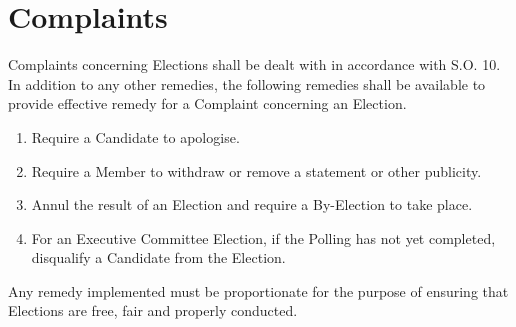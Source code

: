 \section{Complaints}
\npara Complaints concerning Elections shall be dealt with in accordance with S.O. 10.
\npara In addition to any other remedies, the following remedies shall be available to provide effective remedy for a Complaint concerning an Election.
\begin{enumerate}
\item Require a Candidate to apologise.
\item Require a Member to withdraw or remove a statement or other publicity.
\item Annul the result of an Election and require a By-Election to take place.
\item For an Executive Committee Election, if the Polling has not yet completed, disqualify a Candidate from the Election.
\end{enumerate}
\npara Any remedy implemented must be proportionate for the purpose of ensuring that Elections are free, fair and properly conducted.




